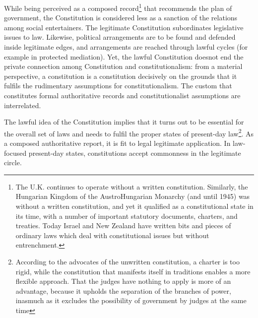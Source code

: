 \setcounter{figure}{0}
\setcounter{table}{0}
\setcounter{footnote}{0}


\label{2020-art8}

\begin{multicols}{2}


\noi
While being perceived as a composed record\footnote{The U.K. continues to operate without a written constitution. Similarly, the Hungarian Kingdom of the AustroHungarian Monarchy (and until 1945) was without a written constitution, and yet it qualified as a constitutional
state in its time, with a number of important statutory documents, charters, and treaties. Today Israel and New
Zealand have written bits and pieces of ordinary laws which deal with constitutional issues but without
entrenchment.}  that recommends the plan of government, the
Constitution is considered less as a sanction of the relations among social entertainers. The
legitimate Constitution subordinates legislative issues to law. Likewise, political
arrangements are to be found and defended inside legitimate edges, and arrangements are
reached through lawful cycles (for example in protected mediation). Yet, the lawful
Constitution doesnot end the private connection among Constitution and constitutionalism:
from a material perspective, a constitution is a constitution decisively on the grounds that it
fulfils the rudimentary assumptions for constitutionalism. The custom that constitutes formal
authoritative records and constitutionalist assumptions are interrelated.

\noi
The lawful idea of the Constitution implies that it turns out to be essential for the overall set
of laws and needs to fulfil the proper states of present-day law\footnote{According to the advocates of the unwritten constitution, a charter is too rigid, while the constitution that
manifests itself in traditions enables a more flexible approach. That the judges have nothing to apply is more of
an advantage, because it upholds the separation of the branches of power, inasmuch as it excludes the possibility
of government by judges at the same time}. As a composed authoritative
report, it is fit to legal legitimate application. In law-focused present-day states, constitutions
accept commonness in the legitimate circle.


\end{multicols}
